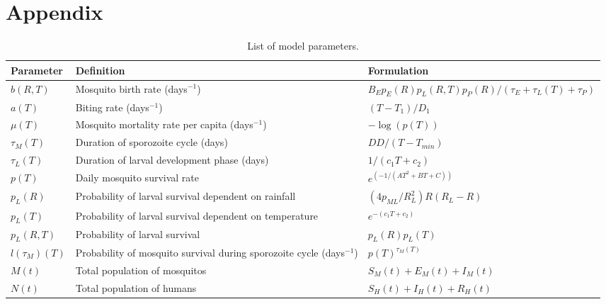 \documentclass[a4paper,fleqn]{cas-dc}
\begin{document}
\clearpage

\appendix
\renewcommand{\thetable}{A.\arabic{table}}
\setcounter{table}{0}  %

\section{Appendix}

\begin{table}[width=2.0\linewidth,cols=3,pos=h]
\caption{List of model parameters.}\label{tbl1}
\renewcommand{\thetable}{Appendix 1}  %
\begin{tabular*}{\tblwidth}{@{} LLL@{} }
\toprule
Parameter & Definition & Formulation\\
\midrule
$b(R, T)$   & Mosquito birth rate (days$^{-1}$)   & ${B_E  p_E(R)  p_L(R,T)  p_P(R)}/{(\tau_E + \tau_L(T) + \tau_P)}$   \\ 
$a(T)$   & Biting rate (days$^{-1}$)  & ${(T - T_1)}/{D_1}$   \\ 
$\mu(T)$   & Mosquito mortality rate per capita (days$^{-1}$)   & $-\log(p(T))$  \\ 
$\tau_M(T)$   & Duration of sporozoite cycle (days)   & ${DD}/{(T - T_{min})}$   \\ 
$\tau_L(T)$   & Duration of larval development phase (days)   & ${1}/{(c_1T + c_2)}$  \\ 
$p(T)$   & Daily mosquito survival rate   & $e^{(-1 / (AT^2 + BT + C))}$ \\  
$p_L(R)$   & Probability of larval survival dependent on rainfall   & $({4p_{ML}}/{R_L^2})R(R_L - R)$  \\  
$p_L(T)$   & Probability of larval survival dependent on temperature   & $e^{-(c_1T + c_2)}$  \\ 
$p_L(R, T)$   &Probability of larval survival   & $p_L(R)p_L(T)$   \\  
$l({\tau_M})(T)$   &  Probability of mosquito survival during sporozoite cycle (days$^{-1}$)  & $p(T)^{\tau_M(T)}$  \\ 
$M(t)$   &  Total population of mosquitos  & $S_M(t) + E_M(t) + I_M(t)$   \\ 
$N(t)$   & Total population of humans   & $S_H(t) + I_H(t) + R_H(t)$   \\ 
\bottomrule
\end{tabular*}
\end{table}

\end{document}
